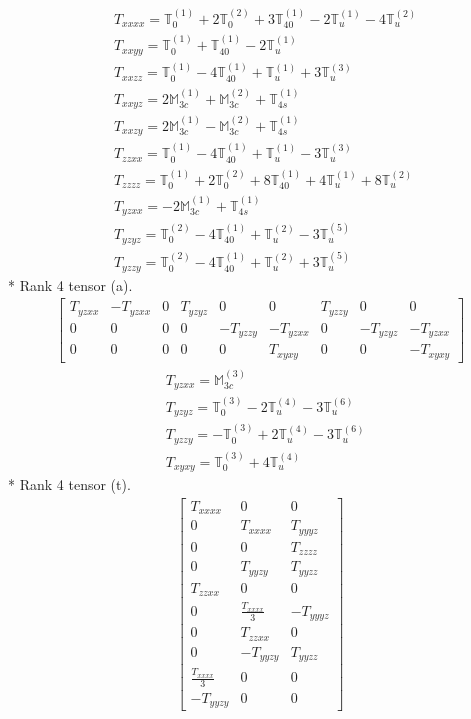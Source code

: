 \documentclass[fleqn,8pt,landscape]{jsarticle}
\begin{document}
\begin{align*}
& T_{xxxx} = \mathbb{T}_{0}^{(1)} + 2 \mathbb{T}_{0}^{(2)} + 3 \mathbb{T}_{40}^{(1)} - 2 \mathbb{T}_{u}^{(1)} - 4 \mathbb{T}_{u}^{(2)} \\
& T_{xxyy} = \mathbb{T}_{0}^{(1)} + \mathbb{T}_{40}^{(1)} - 2 \mathbb{T}_{u}^{(1)} \\
& T_{xxzz} = \mathbb{T}_{0}^{(1)} - 4 \mathbb{T}_{40}^{(1)} + \mathbb{T}_{u}^{(1)} + 3 \mathbb{T}_{u}^{(3)} \\
& T_{xxyz} = 2 \mathbb{M}_{3c}^{(1)} + \mathbb{M}_{3c}^{(2)} + \mathbb{T}_{4s}^{(1)} \\
& T_{xxzy} = 2 \mathbb{M}_{3c}^{(1)} - \mathbb{M}_{3c}^{(2)} + \mathbb{T}_{4s}^{(1)} \\
& T_{zzxx} = \mathbb{T}_{0}^{(1)} - 4 \mathbb{T}_{40}^{(1)} + \mathbb{T}_{u}^{(1)} - 3 \mathbb{T}_{u}^{(3)} \\
& T_{zzzz} = \mathbb{T}_{0}^{(1)} + 2 \mathbb{T}_{0}^{(2)} + 8 \mathbb{T}_{40}^{(1)} + 4 \mathbb{T}_{u}^{(1)} + 8 \mathbb{T}_{u}^{(2)} \\
& T_{yzxx} = - 2 \mathbb{M}_{3c}^{(1)} + \mathbb{T}_{4s}^{(1)} \\
& T_{yzyz} = \mathbb{T}_{0}^{(2)} - 4 \mathbb{T}_{40}^{(1)} + \mathbb{T}_{u}^{(2)} - 3 \mathbb{T}_{u}^{(5)} \\
& T_{yzzy} = \mathbb{T}_{0}^{(2)} - 4 \mathbb{T}_{40}^{(1)} + \mathbb{T}_{u}^{(2)} + 3 \mathbb{T}_{u}^{(5)}
\end{align*}
* Rank 4 tensor (a).
\begin{align*}
\begin{bmatrix} T_{yzxx} & - T_{yzxx} & 0 & T_{yzyz} & 0 & 0 & T_{yzzy} & 0 & 0 \\ 0 & 0 & 0 & 0 & - T_{yzzy} & - T_{yzxx} & 0 & - T_{yzyz} & - T_{yzxx} \\ 0 & 0 & 0 & 0 & 0 & T_{xyxy} & 0 & 0 & - T_{xyxy} \end{bmatrix}
\end{align*}
\begin{align*}
& T_{yzxx} = \mathbb{M}_{3c}^{(3)} \\
& T_{yzyz} = \mathbb{T}_{0}^{(3)} - 2 \mathbb{T}_{u}^{(4)} - 3 \mathbb{T}_{u}^{(6)} \\
& T_{yzzy} = - \mathbb{T}_{0}^{(3)} + 2 \mathbb{T}_{u}^{(4)} - 3 \mathbb{T}_{u}^{(6)} \\
& T_{xyxy} = \mathbb{T}_{0}^{(3)} + 4 \mathbb{T}_{u}^{(4)}
\end{align*}
* Rank 4 tensor (t).
\begin{align*}
\begin{bmatrix} T_{xxxx} & 0 & 0 \\ 0 & T_{xxxx} & T_{yyyz} \\ 0 & 0 & T_{zzzz} \\ 0 & T_{yyzy} & T_{yyzz} \\ T_{zzxx} & 0 & 0 \\ 0 & \frac{T_{xxxx}}{3} & - T_{yyyz} \\ 0 & T_{zzxx} & 0 \\ 0 & - T_{yyzy} & T_{yyzz} \\ \frac{T_{xxxx}}{3} & 0 & 0 \\ - T_{yyzy} & 0 & 0 \end{bmatrix}
\end{align*}
\end{document}
